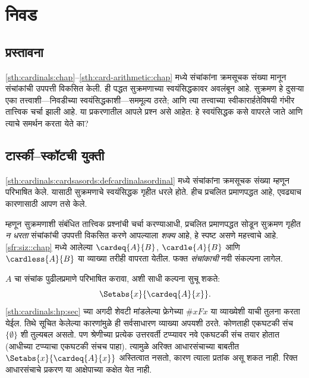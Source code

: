 \chapter{निवड}\label{sth:choice:chap}





\section{प्रस्तावना}\label{sth:choice:intro:sec}

\ref{sth:cardinals:chap}--\ref{sth:card-arithmetic:chap} मध्ये संचांकांना क्रमसूचक संख्या मानून संचांकांची उपपत्ती विकसित केली. ही पद्धत सुक्रमणाच्या स्वयंसिद्धकावर अवलंबून आहे. सुक्रमण हे दुसऱ्या एका तत्त्वाशी---निवडीच्या स्वयंसिद्धकाशी---सममूल्य ठरते; आणि त्या तत्त्वाच्या स्वीकारार्हतेविषयी गंभीर तात्त्विक चर्चा झाली आहे. या प्रकरणातील आपले प्रश्न असे आहेत: हे स्वयंसिद्धक कसे वापरले जाते आणि त्याचे समर्थन करता येते का?







\section{टार्स्की--स्कॉटची युक्ती}\label{sth:choice:tarskiscott:sec}

\ref{sth:cardinals:cardsasords:defcardinalasordinal} मध्ये संचांकांना क्रमसूचक संख्या म्हणून परिभाषित केले. यासाठी सुक्रमणाचे स्वयंसिद्धक गृहीत धरले होते. हीच प्रचलित प्रमाणपद्धत आहे, एवढ्याच कारणासाठी आपण तसे केले.

म्हणून सुक्रमणाशी संबंधित तात्त्विक प्रश्नांची चर्चा करण्याआधी, प्रचलित प्रमाणपद्धत सोडून सुक्रमण गृहीत \emph{न धरता} संचांकांची उपपत्ती विकसित करणे आपल्याला \emph{शक्य} आहे, हे स्पष्ट असणे महत्त्वाचे आहे. \ref{sfr:siz::chap} मध्ये आलेल्या $\cardeq{A}{B}$, $\cardle{A}{B}$ आणि $\cardless{A}{B}$ या व्याख्या तरीही वापरता येतील. फक्त \emph{संचांकाची} नवी संकल्पना लागेल.

$A$ चा संचांक पुढीलप्रमाणे परिभाषित करावा, अशी साधी कल्पना सुचू शकते:
\[
	\Setabs{x}{\cardeq{A}{x}}.
\]
\ref{sth:cardinals:hp:sec} च्या अगदी शेवटी मांडलेल्या फ्रेगेच्या $\# x Fx$ या व्याख्येशी याची तुलना करता येईल. तिथे सूचित केलेल्या कारणांमुळे ही सर्वसाधारण व्याख्या अपयशी ठरते. कोणताही एकघटकी संच $\{\emptyset\}$ शी तुल्यबल असतो. पण श्रेणीच्या प्रत्येक उत्तरवर्ती टप्प्यावर नवे एकघटकी संच तयार होतात (आधीच्या टप्प्याचा एकघटकी संचच पाहा). त्यामुळे अरिक्त आधारसंचाच्या बाबतीत $\Setabs{x}{\cardeq{A}{x}}$ अस्तित्वात नसतो, कारण त्याला प्रतांक असू शकत नाही. रिक्त आधारसंचाचे प्रकरण या आक्षेपाच्या कक्षेत येत नाही.

